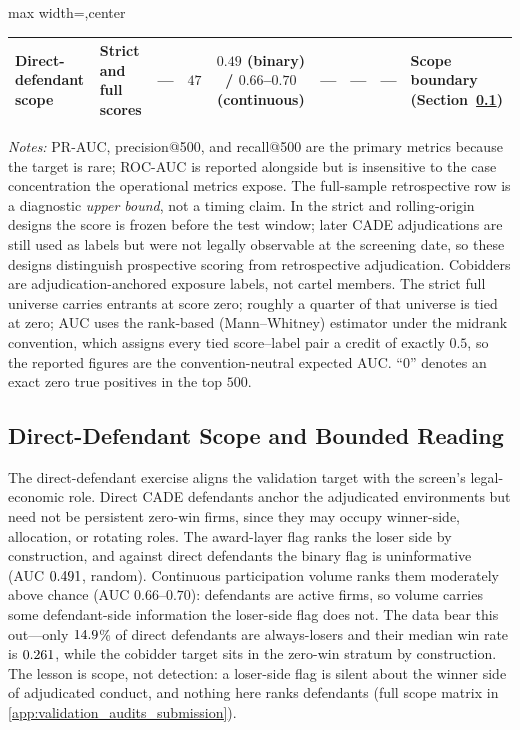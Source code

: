 \begin{table}[htbp]
\begin{adjustbox}{max width=\textwidth,center}
\begin{threeparttable}
\begin{tabular}{p{2.9cm}p{2.6cm}ccccccp{3.2cm}}
Direct-defendant scope & Strict and full scores & --- & $47$ & $0.49$ (binary) / $0.66$--$0.70$ (continuous) & --- & --- & --- & Scope boundary (Section~\ref{sec:validation_direct}) \\
\bottomrule
\end{tabular}
\begin{tablenotes}
\scriptsize
\item \textit{Notes:} PR-AUC, precision@500, and recall@500 are the
primary metrics because the target is rare; ROC-AUC is reported
alongside but is insensitive to the case concentration the
operational metrics expose. The full-sample retrospective row is a
diagnostic \emph{upper bound}, not a timing claim. In the strict and
rolling-origin designs the score is frozen before the test window;
later CADE adjudications are still used as labels but were not
legally observable at the screening date, so these designs
distinguish prospective scoring from retrospective adjudication.
Cobidders are adjudication-anchored exposure labels, not cartel
members. The strict full universe carries entrants at score zero;
roughly a quarter of that universe is tied at zero; AUC uses the
rank-based (Mann--Whitney) estimator under the midrank convention,
which assigns every tied score--label pair a credit of exactly
$0.5$, so the reported figures are the convention-neutral expected
AUC. ``$0$'' denotes
an exact zero true positives in the top $500$.
\end{tablenotes}
\end{threeparttable}
\end{adjustbox}
\end{table}

\subsection{Direct-Defendant Scope and Bounded Reading}
\label{sec:validation_direct}
\label{sec:validation_summary}

The direct-defendant exercise aligns the validation target with the
screen's legal-economic role. Direct CADE defendants anchor the
adjudicated environments but need not be persistent zero-win firms,
since they may occupy winner-side, allocation, or rotating roles.
The award-layer flag ranks the loser side by construction, and
against direct defendants the binary flag is uninformative
(AUC $0.491$, random). Continuous participation volume
ranks them moderately above chance (AUC $0.66$--$0.70$): defendants
are active firms, so volume carries some defendant-side information
the loser-side flag does not. The data bear this out---only
$14.9$\% of direct defendants are always-losers and
their median win rate is $0.261$, while the cobidder
target sits in the zero-win stratum by construction. The lesson is
scope, not detection: a loser-side flag is silent about the winner
side of adjudicated conduct, and nothing here ranks defendants
(full scope matrix in \ref{app:validation_audits_submission}).

